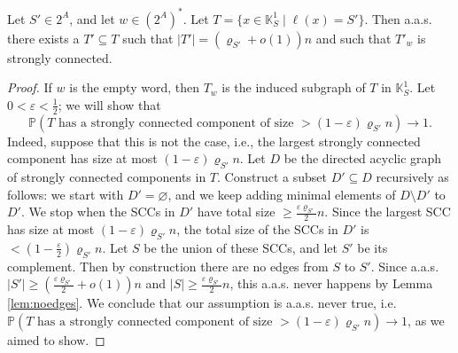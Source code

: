 \documentclass[runngingheads]{llncs}
\begin{document}
\begin{lemma} \label{lem:strongcon}
Let $S' \in 2^A$, and let $w \in (2^A)^*$. Let $T = \{x \in \mathbb{K}^1_S \mid \ell(x) = S'\}$. Then a.a.s. there exists a $T' \subseteq T$ such that $|T'| = (\varrho_{S'}+o(1))n$ and such that $T'_{w}$ is strongly connected.
\end{lemma}

\begin{proof}
If $w$ is the empty word, then $T_w$ is the induced subgraph of $T$ in $\mathbb{K}^1_S$. Let $0 < \varepsilon < \tfrac{1}{2}$; we will show that 
\[
\mathbb{P}(T \textrm{ has a strongly connected component of size $>(1-\varepsilon)\varrho_{S'} n$}) \rightarrow 1.
\]
Indeed, suppose that this is not the case, i.e., the largest strongly connected component has size at most $(1-\varepsilon)\varrho_{S'} n$. Let $D$ be the directed acyclic graph of strongly connected components in $T$. Construct a subset $D' \subseteq D$ recursively as follows: we start with $D' = \varnothing$, and we keep adding minimal elements of $D \setminus D'$ to $D'$. We stop when the SCCs in $D'$ have total size $\geq \tfrac{\varepsilon\varrho_{S'}}{2}n$. Since the largest SCC has size at most $(1-\varepsilon)\varrho_{S'} n$, the total size of the SCCs in $D'$ is $< (1-\tfrac{\varepsilon}{2})\varrho_{S'} n$. Let $S$ be the union of these SCCs, and let $S'$ be its complement. Then by construction there are no edges from $S$ to $S'$. Since a.a.s. $|S'| \geq (\tfrac{\varepsilon\varrho_{S'}}{2}+o(1))n$ and $|S| \geq \tfrac{\varepsilon \varrho_{S'}}{2}n$, this a.a.s. never happens by Lemma \ref{lem:noedges}. We conclude that our assumption is a.a.s. never true, i.e. $\mathbb{P}(T \textrm{ has a strongly connected component of size $> (1-\varepsilon)\varrho_{S'} n$}) \rightarrow 1$, as we aimed to show.


\end{proof}
\end{document}
